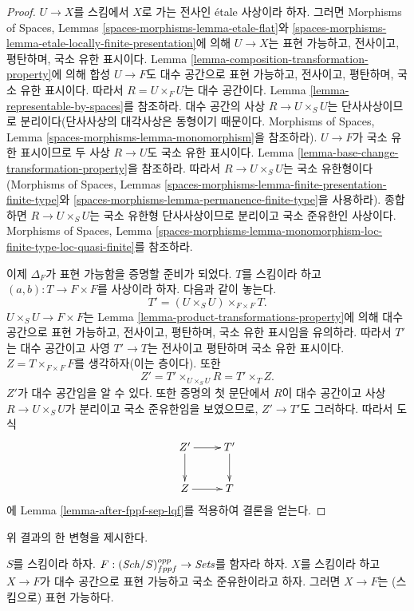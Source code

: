 \begin{proof}
$U \to X$를 스킴에서 $X$로 가는 전사인 \'etale 사상이라 하자.
그러면 Morphisms of Spaces, Lemmas
\ref{spaces-morphisms-lemma-etale-flat}와
\ref{spaces-morphisms-lemma-etale-locally-finite-presentation}에 의해
$U \to X$는 표현 가능하고, 전사이고, 평탄하며, 국소 유한 표시이다.
Lemma \ref{lemma-composition-transformation-property}에 의해 합성
$U \to F$도 대수 공간으로 표현 가능하고, 전사이고, 평탄하며, 국소
유한 표시이다. 따라서 $R = U \times_F U$는 대수 공간이다.
Lemma \ref{lemma-representable-by-spaces}를 참조하라. 대수 공간의 사상
$R \to U \times_S U$는 단사사상이므로 분리이다(단사사상의 대각사상은
동형이기 때문이다. Morphisms of Spaces, Lemma
\ref{spaces-morphisms-lemma-monomorphism}을 참조하라). $U \to F$가 국소
유한 표시이므로 두 사상 $R \to U$도 국소 유한 표시이다. Lemma
\ref{lemma-base-change-transformation-property}을 참조하라. 따라서
$R \to U \times_S U$는 국소 유한형이다(Morphisms of Spaces, Lemmas
\ref{spaces-morphisms-lemma-finite-presentation-finite-type}와
\ref{spaces-morphisms-lemma-permanence-finite-type}을 사용하라).
종합하면 $R \to U \times_S U$는 국소 유한형 단사사상이므로 분리이고
국소 준유한인 사상이다. Morphisms of Spaces, Lemma
\ref{spaces-morphisms-lemma-monomorphism-loc-finite-type-loc-quasi-finite}를
참조하라.

\medskip\noindent
이제 $\Delta_F$가 표현 가능함을 증명할 준비가 되었다. $T$를 스킴이라
하고 $(a, b) : T \to F \times F$를 사상이라 하자. 다음과 같이 놓는다.
$$
T' = (U \times_S U) \times_{F \times F} T.
$$
$U \times_S U \to F \times F$는
Lemma \ref{lemma-product-transformations-property}에 의해 대수 공간으로
표현 가능하고, 전사이고, 평탄하며, 국소 유한 표시임을 유의하라.
따라서 $T'$는 대수 공간이고 사영 $T' \to T$는 전사이고 평탄하며 국소
유한 표시이다. $Z = T \times_{F \times F} F$를 생각하자(이는 층이다).
또한
$$
Z' = T' \times_{U \times_S U} R
= T' \times_T Z.
$$
$Z'$가 대수 공간임을 알 수 있다. 또한 증명의 첫 문단에서 $R$이 대수
공간이고 사상 $R \to U \times_S U$가 분리이고 국소 준유한임을
보였으므로, $Z' \to T'$도 그러하다. 따라서 도식
$$
\xymatrix{
Z' \ar[r] \ar[d] & T' \ar[d] \\
Z \ar[r] & T
}
$$
에 Lemma \ref{lemma-after-fppf-sep-lqf}를 적용하여 결론을 얻는다.
\end{proof}

\noindent
위 결과의 한 변형을 제시한다.

\begin{lemma}
\label{lemma-bootstrap-locally-quasi-finite}
$S$를 스킴이라 하자. $F : (\mathit{Sch}/S)_{fppf}^{opp} \to \textit{Sets}$를
함자라 하자. $X$를 스킴이라 하고 $X \to F$가 대수 공간으로 표현
가능하고 국소 준유한이라고 하자. 그러면 $X \to F$는 (스킴으로)
표현 가능하다.
\end{lemma}

